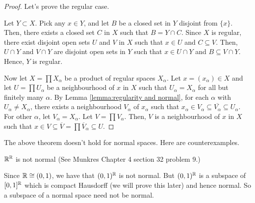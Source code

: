 \begin{proof}
    Let's prove the regular case. 

    Let $Y\subset X$. Pick any $x\in Y$, and let $B$ be a closed set in $Y$ disjoint from $\{x\}$. Then, there exists a closed set $C$ in $X$ such that $B=Y\cap C$. Since $X$ is regular, there exist disjoint open sets $U$ and $V$ in $X$ such that $x\in U$ and $C\subseteq V$. Then, $U\cap Y$ and $V\cap Y$ are disjoint open sets in $Y$ such that $x\in U\cap Y$ and $B\subseteq V\cap Y$. Hence, $Y$ is regular.

    Now let $X=\prod X_\alpha$ be a product of regular spaces $X_\alpha$. Let $x=(x_\alpha)\in X$ and let $U=\prod U_\alpha$ be a neighbourhood of $x$ in $X$ such that $U_\alpha=X_\alpha$ for all but finitely many $\alpha$. By Lemma \ref{lemma:regularity and normal}, for each $\alpha$ with $U_\alpha\neq X_\alpha$, there exists a neighbourhood $V_\alpha$ of $x_\alpha$ such that $x_\alpha\in V_\alpha\subseteq \overline{V_\alpha}\subseteq U_\alpha$. For other $\alpha$, let $V_\alpha=X_\alpha$. Let $V=\prod V_\alpha$. Then, $V$ is a neighbourhood of $x$ in $X$ such that $x\in V\subseteq \overline{V}=\prod \overline{V}_\alpha\subseteq U$. 
\end{proof}

The above theorem doesn't hold for normal spaces. Here are counterexamples.

\begin{example}
    $\mathbb{R}^{\mathbb{R}}$ is not normal (See Munkres Chapter 4 section 32 problem 9.)

    Since $\mathbb{R}\cong (0,1)$, we have that $(0,1)^{\mathbb{R}}$ is not normal. But $(0,1)^{\mathbb{R}}$ is a subspace of $[0,1]^{\mathbb{R}}$ which is compact Hausdorff (we will prove this later) and hence normal. So a subspace of a normal space need not be normal.
\end{example}

